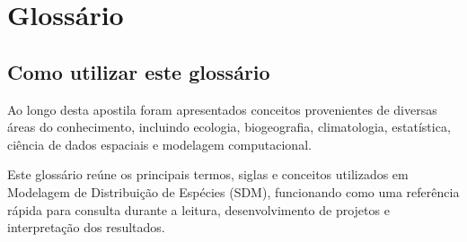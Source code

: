 \chapter*{Glossário}

\section*{Como utilizar este glossário}

Ao longo desta apostila foram apresentados conceitos provenientes de diversas
áreas do conhecimento, incluindo ecologia, biogeografia, climatologia,
estatística, ciência de dados espaciais e modelagem computacional.

Este glossário reúne os principais termos, siglas e conceitos utilizados em
Modelagem de Distribuição de Espécies (SDM), funcionando como uma referência
rápida para consulta durante a leitura, desenvolvimento de projetos e
interpretação dos resultados.

